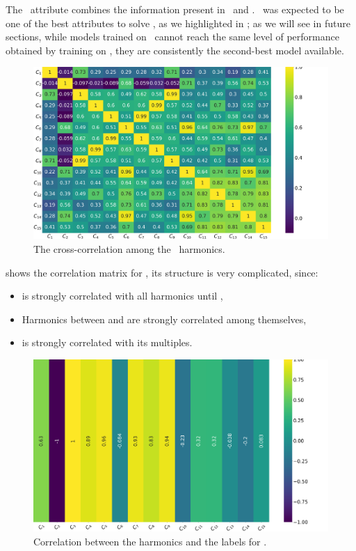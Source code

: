 \subsubsection{\cnmod}
The \cnmod\ attribute combines the information present in \an\ and \bn. \cnmod\ was expected to be one
of the best attributes to solve \qrp, as we highlighted in ; as we will see in
future sections, while models trained on \cnmod\ cannot reach the same level of performance obtained
by training on \an, they are consistently the second-best model available.
\begin{figure}[!ht]
	\centering
	\includegraphics[width=\linewidth]{img/Cnmod_corr_matrix.png}
	\caption{The cross-correlation among the \cnmod\ harmonics.} \label{fig:cnmod-corr}
\end{figure}

 shows the correlation matrix for \cnmod, its structure is very complicated,
since:
\begin{itemize}
	\item \cnmod[2] is strongly correlated with all harmonics until \cnmod[9],
	\item Harmonics between \cnmod[10] and \cnmod[15] are strongly correlated among themselves,
	\item \cnmod[4] is strongly correlated with its multiples.
\end{itemize}
\begin{figure}[!ht]
	\centering
	\includegraphics[width=0.7\linewidth]{img/Cnmod_label_corr.png}
	\caption{Correlation between the harmonics and the labels for \cnmod.} \label{fig:cnmod-lcorr}
\end{figure}


